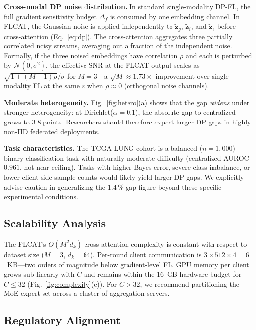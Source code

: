 \documentclass[a4paper,fleqn]{cas-dc}
\begin{document}
\textbf{Cross-modal DP noise distribution.} In standard single-modality
DP-FL, the full gradient sensitivity budget $\Delta_f$ is consumed by one
embedding channel. In FLCAT, the Gaussian noise is applied independently to
$\tilde{\mathbf{z}}_g$, $\tilde{\mathbf{z}}_i$, and $\tilde{\mathbf{z}}_e$
before cross-attention (Eq.~\ref{eq:dp}). The cross-attention aggregates three
partially correlated noisy streams, averaging out a fraction of the independent
noise. Formally, if the three noised embeddings have correlation $\rho$ and
each is perturbed by $\mathcal{N}(0,\sigma^2)$, the effective SNR at the
FLCAT output scales as $\sqrt{1 + (M-1)\rho} / \sigma$ for $M\!=\!3$---a
$\sqrt{M}\!\approx\!1.73\!\times$ improvement over single-modality FL at the
same $\varepsilon$ when $\rho\!\approx\!0$ (orthogonal noise channels).

\textbf{Moderate heterogeneity.} Fig.~\ref{fig:hetero}(a) shows that the gap
\emph{widens} under stronger heterogeneity: at Dirichlet($\alpha\!=\!0.1$),
the absolute gap to centralized grows to 3.8 points. Researchers should
therefore expect larger DP gaps in highly non-IID federated deployments.

\textbf{Task characteristics.} The TCGA-LUNG cohort is a balanced ($n\!=\!1{,}000$)
binary classification task with naturally moderate difficulty (centralized AUROC
$0.961$, not near ceiling). Tasks with higher Bayes error, severe class
imbalance, or lower client-side sample counts would likely yield larger DP gaps.
We explicitly advise caution in generalizing the $1.4\,\%$ gap figure beyond
these specific experimental conditions.

\subsection{Scalability Analysis}

The FLCAT's $O(M^2 d_k)$ cross-attention complexity is constant with respect
to dataset size ($M\!=\!3$, $d_k\!=\!64$). Per-round client communication is
$3\!\times\!512\!\times\!4\!=\!6$~KB---two orders of magnitude below
gradient-level FL. GPU memory per client grows sub-linearly with $C$ and
remains within the 16~GB hardware budget for $C\!\leq\!32$
(Fig.~\ref{fig:complexity}(c)). For $C\!>\!32$, we recommend partitioning the
MoE expert set across a cluster of aggregation servers.

\subsection{Regulatory Alignment}
\end{document}
